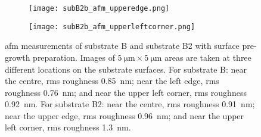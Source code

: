 \begin{figure}[htbp]
\begin{subfigure}[t]{0.3\linewidth}
    \centering
        \texttt{[image: subB2b\_afm\_upperedge.png]}
        \caption{}\label{fig:subB2b_afm_edge}
    \end{subfigure}%
    \hfill
    \begin{subfigure}[t]{0.3\linewidth}
    \centering
        \texttt{[image: subB2b\_afm\_upperleftcorner.png]}
        \caption{}\label{fig:subB2b_afm_corner} 
    \end{subfigure}%
    \caption[\Ac{afm} of substrate B and substrate B2 with surface pre-growth preparation.]{\Acf{afm} measurements of substrate B and substrate B2 with surface pre-growth preparation. Images of $\SI{5}{\micro\metre}\times\SI{5}{\micro\metre}$ areas are taken at three different locations on the substrate surfaces. For substrate B:  near the centre, \ac{rms} roughness \SI{0.85}{\nano\metre};  near the left edge, \ac{rms} roughness \SI{0.76}{\nano\metre}; and  near the upper left corner, \ac{rms} roughness \SI{0.92}{\nano\metre}. For substrate B2:  near the centre, \ac{rms} roughness \SI{0.91}{\nano\metre};  near the upper edge, \ac{rms} roughness \SI{0.96}{\nano\metre}; and  near the upper left corner, \ac{rms} roughness \SI{1.3}{\nano\metre}.}\label{fig:subBb_and_subB2_afm}
\end{figure} %


